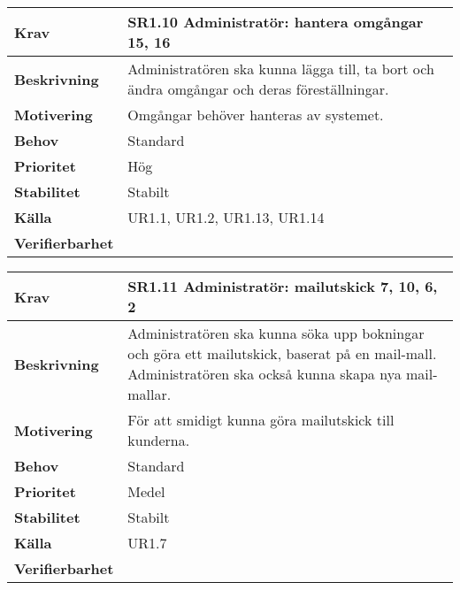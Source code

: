 \documentclass[a4paper, twoside, 11pt, titlepage]{article}
\begin{document}
	\begin{tabular} { p{2.6cm} p{12.5cm} }
		\hline
		\sffamily\textbf{Krav} & \sffamily\textbf{SR1.10 Administratör: hantera omgångar 15, 16 } \\
		\hline
		\sffamily\textbf{Beskrivning} & Administratören ska kunna lägga till, ta bort och ändra omgångar och deras föreställningar.  \\
		\hline
		\sffamily\textbf{Motivering} & Omgångar behöver hanteras av systemet.  \\
		\hline
		\sffamily\textbf{Behov} & Standard  \\
		\hline
		\sffamily\textbf{Prioritet} & Hög  \\
		\hline
		\sffamily\textbf{Stabilitet} & Stabilt  \\
		\hline
		\sffamily\textbf{Källa} & UR1.1, UR1.2, UR1.13, UR1.14  \\
		\hline
		\sffamily\textbf{Verifierbarhet} &   \\
		\hline
	\end{tabular}
	\vspace{6mm}

	\begin{tabular} { p{2.6cm} p{12.5cm} }
		\hline
		\sffamily\textbf{Krav} & \sffamily\textbf{SR1.11 Administratör: mailutskick 7, 10, 6, 2 } \\
		\hline
		\sffamily\textbf{Beskrivning} & Administratören ska kunna söka upp bokningar och göra ett mailutskick, baserat på en mail-mall. Administratören ska också kunna skapa nya mail-mallar.  \\
		\hline
		\sffamily\textbf{Motivering} & För att smidigt kunna göra mailutskick till kunderna.  \\
		\hline
		\sffamily\textbf{Behov} & Standard  \\
		\hline
		\sffamily\textbf{Prioritet} & Medel  \\
		\hline
		\sffamily\textbf{Stabilitet} & Stabilt  \\
		\hline
		\sffamily\textbf{Källa} & UR1.7  \\
		\hline
		\sffamily\textbf{Verifierbarhet} &   \\
		\hline
	\end{tabular}
	\vspace{6mm}
\end{document}
